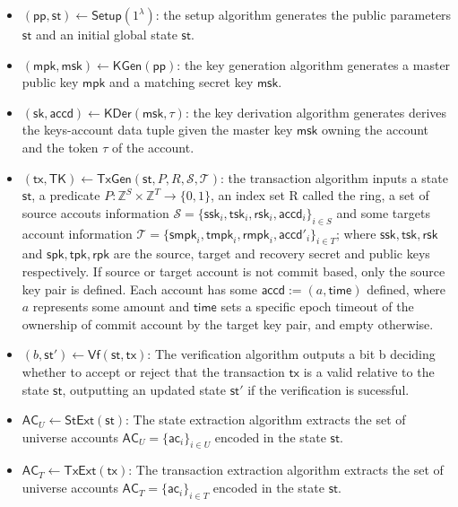 \documentclass{article}      	%
\begin{document}
\begin{itemize}
    \item $(\mathsf{pp,st}) \gets \mathsf{Setup}(1^\lambda)$: the setup algorithm generates the public parameters $\mathsf{st}$ and an initial global state $\mathsf{st}$.
    \item $(\mathsf{mpk},\mathsf{msk}) \gets \mathsf{KGen}(\mathsf{pp})$: the key generation algorithm generates a master public key $\mathsf{mpk}$ and a matching secret key $\mathsf{msk}$.
    \item $(\mathsf{sk},\mathsf{accd}) \gets \mathsf{KDer}(\mathsf{msk, \tau})$: the key derivation algorithm generates derives the keys-account data tuple given the master key $\mathsf{msk}$ owning the account and the token $\tau$ of the account.
    \item $(\mathsf{tx,TK}) \gets \mathsf{TxGen}(\mathsf{st},P,R,\mathcal{S},\mathcal{T})$: the transaction algorithm inputs a state $\mathsf{st}$, a predicate $P: \mathbb{Z}^S \times \mathbb{Z}^T \rightarrow \{0,1\}$, an index set R called the ring, a set of source accouts information $\mathcal{S} = \{\mathsf{ssk}_i, \mathsf{tsk}_i, \mathsf{rsk}_i, \mathsf{accd}_i\}_{i\in S}$ and some targets account information $\mathcal{T} = \{\mathsf{smpk}_i, \mathsf{tmpk}_i, \mathsf{rmpk}_i, \mathsf{accd}'_i\}_{i\in T}$; where $\mathsf{ssk,tsk,rsk}$ and $\mathsf{spk,tpk,rpk}$ are the source, target and recovery secret and public keys respectively. If source or target account is not commit based, only the source key pair is defined. Each account has some $\mathsf{accd} := (a,\mathsf{time})$ defined, where $a$ represents some amount and $\mathsf{time}$ sets a specific epoch timeout of the ownership of commit account by the target key pair, and empty otherwise. 
    \item $(b,\mathsf{st}') \gets \mathsf{Vf}(\mathsf{st,tx})$: The verification algorithm outputs a bit b deciding whether to accept or reject that the transaction $\mathsf{tx}$ is a valid relative to the state $\mathsf{st}$, outputting an updated state $\mathsf{st}'$ if the verification is sucessful.
\item $\mathsf{AC}_U \gets \mathsf{StExt}(\mathsf{st})$: The state extraction algorithm
extracts the set of universe accounts $\mathsf{AC}_U = \{\mathsf{ac}_i\}_{i \in U}$ encoded in the state $\mathsf{st}$.
\item $\mathsf{AC}_T \gets \mathsf{TxExt}(\mathsf{tx})$: The transaction extraction algorithm
extracts the set of universe accounts $\mathsf{AC}_T = \{\mathsf{ac}_i\}_{i \in T}$ encoded in the state $\mathsf{st}$.

\end{itemize}
\end{document}
